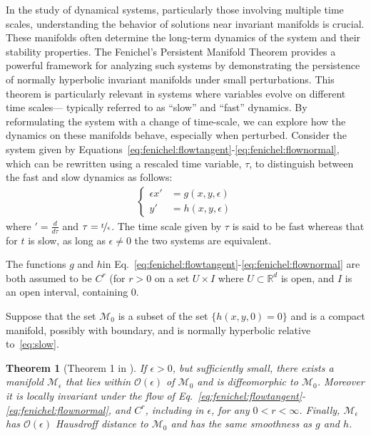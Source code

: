 \documentclass{article} %
\newcounter{ct}
\newcommand{\reals}{\mathbb{R}}
\newcommand{\manifold}{\mathcal{M}}
\newtheorem{theorem}{Theorem}
\theoremstyle{definition}
\theoremstyle{remark}
\begin{document}
In the study of dynamical systems, particularly those involving multiple time scales, understanding the behavior of solutions near invariant manifolds is crucial.
These manifolds often determine the long-term dynamics of the system and their stability properties.
 The Fenichel's Persistent Manifold Theorem provides a powerful framework for analyzing such systems by demonstrating the persistence of normally hyperbolic invariant manifolds under small perturbations. This theorem is particularly relevant in systems where variables evolve on different time scales--- typically referred to as ``slow'' and ``fast'' dynamics.
 By reformulating the system with a change of time-scale, we can explore how the dynamics on these manifolds behave, especially when perturbed.
Consider the system given by Equations~\ref{eq:fenichel:flowtangent}-\ref{eq:fenichel:flownormal}, which can be rewritten using a rescaled time variable, \(\tau\), to distinguish between the fast and slow dynamics as follows:
\begin{align}\label{eq:slow}
\begin{cases}
\epsilon x' &= g (x, y , \epsilon) \\
y'&= h(x, y, \epsilon)
\end{cases}
\end{align}
where  \('=\frac{d}{d\tau}\) and \(\tau=\nicefrac{t}{\epsilon}\).
 The time scale given by \(\tau\) is said to be fast whereas that for \(t\) is slow, as long as \(\epsilon\neq 0\) the two systems are equivalent.


The functions \(g\) and \(h\)in Eq.~\ref{eq:fenichel:flowtangent}-\ref{eq:fenichel:flownormal} are both assumed to be \(C^{r}\) (for \(r>0\) on a set \(U \times I\) where \(U\subset\reals^{d}\) is open, and \(I\) is an open interval, containing \(0\).

Suppose that the set \(\manifold_{0}\)  is a subset of the set \(\{h(x, y, 0) = 0\}\) and is a compact manifold, possibly with boundary, and is normally hyperbolic relative to~\ref{eq:slow}.


\begin{theorem}[Theorem 1 in \citep{Jones1995}]\label{theorem:originalpersistent}
If \(\epsilon >0\), but sufficiently small, there exists a manifold \(\manifold_{\epsilon}\) that lies within \(\mathcal{O}(\epsilon)\) of \(\manifold_{0}\) and is diffeomorphic to \(\manifold_{0}\).
 Moreover it is locally invariant under the flow of Eq.~\ref{eq:fenichel:flowtangent}-\ref{eq:fenichel:flownormal}, and \(C^{r}\), including in \(\epsilon\), for any \(0<r< \infty\).
 Finally, \(\manifold_{\epsilon}\) has \(\mathcal{O}(\epsilon)\) Hausdroff distance to \(\manifold_{0}\) and has the same smoothness as \(g\) and \(h\).
\end{theorem}
\end{document}
